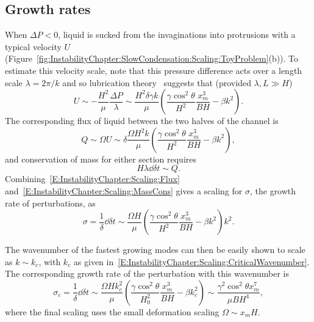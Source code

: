 \subsection{Growth rates}
When $\Delta P < 0$, liquid is sucked from the invaginations into protrusions with a typical velocity $U$ (Figure~\ref{fig:InstabilityChapter:SlowCondensation:Scaling:ToyProblem}(b)). To estimate this velocity scale, note that this  pressure difference acts over a length scale $\lambda = 2\pi/k$ and so lubrication theory~\citep{Leal2007} suggests that (provided $\lambda,L \gg H$)
\begin{equation}
U \sim -\frac{H^2}{\mu}\frac{\Delta P}{\lambda}\sim \frac{H^2 \delta \gamma k}{\mu}\left(\frac{\gamma \cos^2 \theta}{H^2}\frac{x_m^3}{B H} - \beta k^2\right).
\end{equation}
The corresponding flux of liquid between the two halves of the channel is
\begin{equation}\label{E:InstabilityChapter:Scaling:Flux}
Q \sim \Omega U \sim \delta \frac{\Omega H^2 k}{\mu}\left(\frac{\gamma \cos^2 \theta}{H^2}\frac{ x_m^3}{B H} - \beta k^2\right),
\end{equation}
and conservation of mass for either section requires
\begin{equation}\label{E:InstabilityChapter:Scaling:MassCons}
H \lambda \dd{\delta}{t} \sim Q.
\end{equation}
Combining~\eqref{E:InstabilityChapter:Scaling:Flux} and~\eqref{E:InstabilityChapter:Scaling:MassCons} gives a scaling for $\sigma$, the growth rate of perturbations, as
\begin{equation}\label{E:InstabilityChapter:Scaling:amplitude_ode}
\sigma = \frac{1}{\delta} \dd{\delta}{t} \sim \frac{\Omega H}{\mu}\left(\frac{\gamma \cos^2 \theta}{H^2}\frac{x_m^3}{B H} - \beta k^2\right)k^2.
\end{equation}

The wavenumber of the fastest growing modes can then be easily shown to scale as $k \sim k_c$, with $k_c$ as given in~\eqref{E:InstabilityChapter:Scaling:CriticalWavenumber}. The corresponding growth rate of the perturbation with this wavenumber is
\begin{equation}\label{E:InstabilityChapter:Scaling:SigmaScaling1}
\sigma_c =  \frac{1}{\delta} \dd{\delta}{t} \sim \frac{\Omega Hk_c^2}{\mu}\left(\frac{\gamma \cos^2 \theta}{H_0^2}\frac{x_m^3}{B H} - \beta k_c^2\right) \sim \frac{\gamma^2 \cos^2 \theta x_m^7}{\mu B H^{4}},
\end{equation}
where the final scaling uses the small deformation scaling $\Omega \sim x_m H$.

